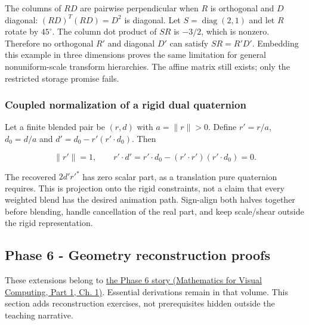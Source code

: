 \hypertarget{02-foundations-ii-ch039-why-a-restricted-trs-representation-is-not-closed}{}

The columns of \(RD\) are pairwise perpendicular when \(R\) is orthogonal and \(D\) diagonal: \((RD)^T(RD)=D^2\) is diagonal. Let \(S=\operatorname{diag}(2,1)\) and let \(R\) rotate by \(45^\circ\). The column dot product of \(SR\) is \(-3/2\), which is nonzero. Therefore no orthogonal \(R'\) and diagonal \(D'\) can satisfy \(SR=R'D'\). Embedding this example in three dimensions proves the same limitation for general nonuniform-scale transform hierarchies. The affine matrix still exists; only the restricted storage promise fails.

\subsubsection{Coupled normalization of a rigid dual quaternion}\label{02-foundations-ii-ch039-coupled-normalization-of-a-rigid-dual-quaternion}

\hypertarget{02-foundations-ii-ch039-coupled-normalization-of-a-rigid-dual-quaternion}{}

Let a finite blended pair be \((r,d)\) with \(a=\|r\|>0\). Define \(r'=r/a\), \(d_0=d/a\) and \(d'=d_0-r'(r'\cdot d_0)\). Then

\[
\|r'\|=1,\qquad r'\cdot d'=r'\cdot d_0-(r'\cdot r')(r'\cdot d_0)=0.
\]

The recovered \(2d'r'^*\) has zero scalar part, as a translation pure quaternion requires. This is projection onto the rigid constraints, not a claim that every weighted blend has the desired animation path. Sign-align both halves together before blending, handle cancellation of the real part, and keep scale/shear outside the rigid representation.

\subsection{Phase 6 - Geometry reconstruction proofs}\label{02-foundations-ii-ch039-phase-6---geometry-reconstruction-proofs}

\hypertarget{02-foundations-ii-ch039-phase-6---geometry-reconstruction-proofs}{}

These extensions belong to \href{../02-Mathematics-for-Visual-Computing-P01/main.pdf\#nameddest=01-foundations-i-ch017-the-panel-gives-us-a-reason-to-learn}{the Phase 6 story (Mathematics for Visual Computing, Part 1, Ch. 1)}. Essential derivations remain in that volume. This section adds reconstruction exercises, not prerequisites hidden outside the teaching narrative.

